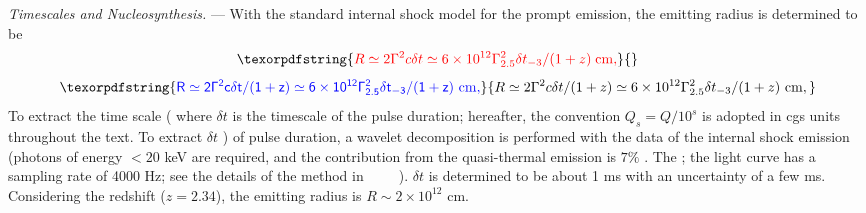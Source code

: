 \documentclass[prd,twocolumn,amsmath,amssymb,aps,linenumbers]{revtex4-2} %
\providecommand{\DIFaddtex}[1]{{\protect\color{blue} \sf #1}} %
\providecommand{\DIFdeltex}[1]{{\protect\color{red} \scriptsize #1}} %
\providecommand{\DIFaddbegin}{} %
\providecommand{\DIFaddend}{} %
\providecommand{\DIFdelbegin}{} %
\providecommand{\DIFdelend}{} %
\providecommand{\DIFadd}[1]{\texorpdfstring{\DIFaddtex{#1}}{#1}} %
\providecommand{\DIFdel}[1]{\texorpdfstring{\DIFdeltex{#1}}{}} %
\newcommand{\DIFscaledelfig}{0.5}
\newlength{\DIFdelgraphicswidth} %
\newlength{\DIFdelgraphicsheight} %
\newcommand{\DIFaddincludegraphics}[2][]{{\color{blue}\fbox{\DIFOincludegraphics[#1]{#2}}}} %
\newcommand{\DIFdelincludegraphics}[2][]{%
\sbox{\DIFdelgraphicsbox}{\DIFOincludegraphics[#1]{#2}}%
\settoboxwidth{\DIFdelgraphicswidth}{\DIFdelgraphicsbox} %
\settoboxtotalheight{\DIFdelgraphicsheight}{\DIFdelgraphicsbox} %
\scalebox{\DIFscaledelfig}{%
\parbox[b]{\DIFdelgraphicswidth}{\usebox{\DIFdelgraphicsbox}\\[-\baselineskip] \rule{\DIFdelgraphicswidth}{0em}}\llap{\resizebox{\DIFdelgraphicswidth}{\DIFdelgraphicsheight}{%
\setlength{\unitlength}{\DIFdelgraphicswidth}%
\begin{picture}(1,1)%
\thicklines\linethickness{2pt} %
{\color[rgb]{1,0,0}\put(0,0){\framebox(1,1){}}}%
{\color[rgb]{1,0,0}\put(0,0){\line( 1,1){1}}}%
{\color[rgb]{1,0,0}\put(0,1){\line(1,-1){1}}}%
\end{picture}%
}\hspace*{3pt}}} %
} %
\DeclareRobustCommand{\DIFaddbegin}{\DIFOaddbegin \let\includegraphics\DIFaddincludegraphics} %
\DeclareRobustCommand{\DIFaddend}{\DIFOaddend \let\includegraphics\DIFOincludegraphics} %
\DeclareRobustCommand{\DIFdelbegin}{\DIFOdelbegin \let\includegraphics\DIFdelincludegraphics} %
\DeclareRobustCommand{\DIFdelend}{\DIFOaddend \let\includegraphics\DIFOincludegraphics} %
\begin{document}
\textit{Timescales and Nucleosynthesis.} ---
With the standard internal shock model for the prompt emission, the emitting radius is determined to be~\citep{2011ApJ...726...90Z}
\DIFdelbegin \begin{displaymath}
\DIFdel{R \simeq 2 \Gamma^2 c \delta t \simeq 6 \times 10^{12} \Gamma_{2.5}^2 \delta t_{-3}/(1+z) \ {\rm cm},
}\end{displaymath}%
\DIFdelend \DIFaddbegin \begin{equation}\DIFadd{\label{eq:Ris}
R \simeq 2 \Gamma^2 c \delta t/(1+z) \simeq 6 \times 10^{12} \Gamma_{2.5}^2 \delta t_{-3}/(1+z) \ {\rm cm},
}\end{equation}\DIFaddend 
\DIFdelbegin \DIFdel{To extract the time scale (}\DIFdelend \DIFaddbegin \DIFadd{where $\delta t$ is the timescale of the pulse duration; hereafter, the convention $Q_s = Q/10^s$ is adopted in cgs units throughout the text. To extract }\DIFaddend $\delta t$\DIFdelbegin \DIFdel{) of pulse duration}\DIFdelend , a wavelet decomposition is performed with the data of the internal shock emission (photons of energy $< 20$ keV are required, and the contribution from \DIFaddbegin \DIFadd{the }\DIFaddend quasi-thermal emission is $7\%$\DIFdelbegin \DIFdel{. The }\DIFdelend \DIFaddbegin \DIFadd{; the }\DIFaddend light curve has a sampling rate of 4000 Hz; see the details of the method in \DIFdelbegin \DIFdel{~\mbox{%
\citep[][]{2013MNRAS.432..857M}}\hskip0pt%
}\DIFdelend \DIFaddbegin \DIFadd{\mbox{%
\citealt{2013MNRAS.432..857M}}\hskip0pt%
}\DIFaddend ). $\delta t$ is determined to be about 1 ms with an uncertainty of a few ms. Considering the redshift ($z=2.34$), the emitting radius \DIFaddbegin \DIFadd{is }\DIFaddend $R \sim 2 \times 10^{12}$ cm.
\end{document}
